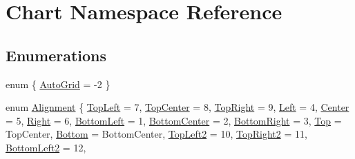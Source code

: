 \hypertarget{namespace_chart}{}\section{Chart Namespace Reference}
\label{namespace_chart}
\subsection*{Enumerations}
\begin{DoxyCompactItemize}
\item 
enum \{ \hyperlink{namespace_chart_ae18eaef27769722572aa24f7750ee41eaf2820acb0bbdc63f3401414adb98a058}{Auto\+Grid} = -\/2
 \}
\item 
enum \hyperlink{namespace_chart_ae222e51ce11a254450b6ddfbc862680a}{Alignment} \{ \newline
\hyperlink{namespace_chart_ae222e51ce11a254450b6ddfbc862680aa0bf92d1d2d6713aa62e92b86b9a8532f}{Top\+Left} = 7, 
\hyperlink{namespace_chart_ae222e51ce11a254450b6ddfbc862680aa2d7225fb69cc698a93b10c138d27c0df}{Top\+Center} = 8, 
\hyperlink{namespace_chart_ae222e51ce11a254450b6ddfbc862680aac9287bfb9c402181fea4697a599c49e5}{Top\+Right} = 9, 
\hyperlink{namespace_chart_ae222e51ce11a254450b6ddfbc862680aae213f3cd1461b109f9aa955d28ed4418}{Left} = 4, 
\newline
\hyperlink{namespace_chart_ae222e51ce11a254450b6ddfbc862680aab21c196681da027efd151236305b985d}{Center} = 5, 
\hyperlink{namespace_chart_ae222e51ce11a254450b6ddfbc862680aa6c2cd6a047fe24d84e993bf0080cb462}{Right} = 6, 
\hyperlink{namespace_chart_ae222e51ce11a254450b6ddfbc862680aa9891b061269ee193b77e12ba1cdbdde0}{Bottom\+Left} = 1, 
\hyperlink{namespace_chart_ae222e51ce11a254450b6ddfbc862680aabfd28bad962df5d0c920f4e2d559669e}{Bottom\+Center} = 2, 
\newline
\hyperlink{namespace_chart_ae222e51ce11a254450b6ddfbc862680aa703be5592999e95917cc26653e0a9b36}{Bottom\+Right} = 3, 
\hyperlink{namespace_chart_ae222e51ce11a254450b6ddfbc862680aa1241079123dca60cd3e026d6be8ba614}{Top} = Top\+Center, 
\hyperlink{namespace_chart_ae222e51ce11a254450b6ddfbc862680aaf753c0b9606a53b9a1f1fff711e14da3}{Bottom} = Bottom\+Center, 
\hyperlink{namespace_chart_ae222e51ce11a254450b6ddfbc862680aaa2118b6c6ea55b39df0922c2bdcc1c0a}{Top\+Left2} = 10, 
\newline
\hyperlink{namespace_chart_ae222e51ce11a254450b6ddfbc862680aaeb6b49524757124e27f96b9d5bc34606}{Top\+Right2} = 11, 
\hyperlink{namespace_chart_ae222e51ce11a254450b6ddfbc862680aa88fdb761d01e73d7368312a33172e430}{Bottom\+Left2} = 12, 

\end{DoxyCompactItemize}
